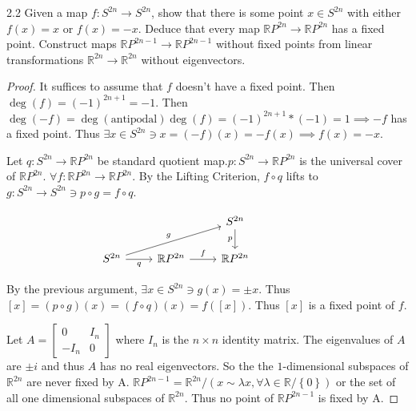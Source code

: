 \documentclass{article}
\newcommand{\R}{\mathbb{R}}
\newcommand{\RP}{\mathbb{R} P}
\begin{document}
\begin{PROB}{2.2}\label{Problem 2.2.}
    Given a map $f: S^{2n} \to S^{2n}$, show that there is some point $x \in S^{2n}$  with either $f(x)=x$ or $f(x)= -x$. Deduce that every map $\RP^{2n} \to \RP^{2n}$ has a fixed point. Construct maps $\RP^{2n - 1} \to \RP^{2n - 1}$ without fixed points from linear transformations $\R^{2n} \to \R^{2n}$  without eigenvectors.
\end{PROB}
\begin{proof}
    It suffices to assume that $f$ doesn't have a fixed point. Then $\deg(f) = (-1)^{2n + 1} = -1$. Then $\deg(-f) = \deg(\text{antipodal})\deg(f) = (-1)^{2n + 1} * (-1) = 1 \implies -f$ has a fixed point. Thus $\exists x \in S^{2n} \ni x = (-f)(x) = -f(x) \implies f(x) = -x$.       

    Let $q: S^{2n} \to \RP^{2n}$ be standard quotient map.$p: S^{2n} \to \RP^{2n}$ is the universal cover of $\RP^{2n}$. $\forall f : \RP^{2n} \to \RP^{2n}$. By the Lifting Criterion, $f \circ q$ lifts to $g: S^{2n} \to S^{2n} \ni p \circ g= f \circ q$. 
    
\[\begin{tikzcd}
	&& {S^{2n}} \\
	{S^{2n}} & {\RP^{2n}} & {\RP^{2n}} && {}
	\arrow["p"', from=1-3, to=2-3]
	\arrow["g", from=2-1, to=1-3]
	\arrow["q"', from=2-1, to=2-2]
	\arrow["f", from=2-2, to=2-3]
\end{tikzcd}\]

    By the previous argument, $\exists x \in S^{2n} \ni g(x) = \pm x$. Thus $[x] = (p \circ g)(x) = (f \circ q)(x) = f([x])$. Thus $[x]$ is a fixed point of $f$. 
    
    Let $A = \begin{bmatrix}
        0 & I_n \\ -I_n & 0
    \end{bmatrix}$ where $I_n$ is the $n \times n$ identity matrix. The eigenvalues of $A$ are $\pm i$ and thus $A$ has no real eigenvectors. So the the $1$-dimensional subspaces of $\R^{2n}$ are never fixed by A. $\RP^{2n - 1} = \R^{2n} / (x \sim \lambda x, \forall \lambda \in \R / \left\{ 0 \right\})$ or the set of all one dimensional subspaces of $\R^{2n}$. Thus no point of $\RP^{2n -1 }$ is fixed by A.              
\end{proof}
\end{document}
